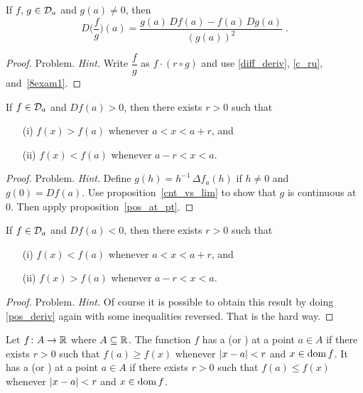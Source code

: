 \begin{prob}
\begin{prop} If $f$, $g \in \mathcal{D}_a$ and $g(a) \ne 0$, then
  \[ D\biggl(\frac fg\biggr)(a) = \frac{g(a)\,Df(a) - f(a)\,Dg(a)}{(g(a))^2}\;. \]
\end{prop}

\begin{proof} Problem. \emph{Hint.} Write $\dfrac fg$ as $f \cdot (r \circ g)$ and use
\ref{diff_deriv}, \ref{c_ru}, and~\ref{8exam1}. \ns
\end{proof}

\begin{prop}\label{pos_deriv} If $f \in \mathcal{D}_a$ and $Df(a) > 0$, then there exists $r > 0$
such that
 \begin{enumerate}
  \item[(i)] $f(x) > f(a)$ whenever $a < x < a+r$, and
  \item[(ii)] $f(x) < f(a)$ whenever $a-r <x < a$.
 \end{enumerate}
\end{prop}

\begin{proof} Problem.  \emph{Hint.} Define $g(h) = h^{-1}\,\Delta f_a(h)$ if $h \ne 0$ and
$g(0) = Df(a)$. Use proposition~\ref{cnt_vs_lim} to show that $g$ is continuous at $0$. Then
apply proposition~\ref{pos_at_pt}.  \ns
\end{proof}

\begin{prop}\label{neg_deriv}  If $f \in \mathcal{D}_a$ and $Df(a) < 0$, then there exists $r > 0$
such that
 \begin{enumerate}
  \item[(i)] $f(x) < f(a)$ whenever $a < x < a+r$, and
  \item[(ii)] $f(x) > f(a)$ whenever $a-r < x < a$.
 \end{enumerate}
\end{prop}

\begin{proof} Problem. \emph{Hint.} Of course it is possible to obtain this result by doing
\ref{pos_deriv} again with some inequalities reversed. That is the hard way.   \ns
\end{proof}

\begin{defn}  Let $f \colon A \rightarrow \mathbb{R}$ where $A \subseteq \mathbb{R}$. The function $f$ has a
 (or
)  at a point $a \in A$ if there exists $r > 0$ such that $f(a) \ge
f(x)$ whenever $\lvert x - a\rvert < r$ and $x \in \operatorname{dom} f$. It has a
 (or
)  at a point $a \in A$ if there exists $r > 0$ such that $f(a) \le
f(x)$ whenever $\lvert x - a\rvert < r$ and $x \in \operatorname{dom} f$.


\end{defn}
\end{prob}
